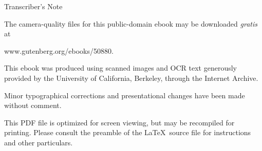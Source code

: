 \documentclass[oneside,12pt]{book}
\newcommand{\iit}[1]{\textit{#1}}
\begin{document}
\frontmatter

\vspace*{1cm}
\vfill
\begin{center}
    Transcriber's Note
\end{center}
\noindent The camera-quality files for this public-domain ebook may be downloaded \iit{gratis} at
\begin{center}
    www.gutenberg.org/ebooks/50880.
\end{center} \par

\noindent This ebook was produced using scanned images and OCR text generously provided by the University of California, Berkeley, through the Internet Archive. \par

\noindent Minor typographical corrections and presentational changes have been made without comment. \par

\noindent This PDF file is optimized for screen viewing, but may be recompiled for printing. Please consult the preamble of the \LaTeX\ source file for instructions and other particulars. \par

\pagebreak

\end{document}
